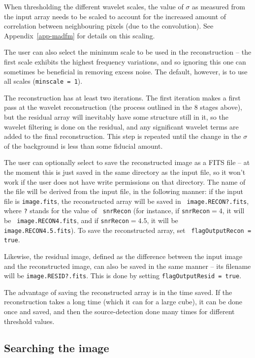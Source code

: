 \documentclass[12pt,a4paper]{article}
\begin{document}
When thresholding the different wavelet scales, the value of $\sigma$
as measured from the input array needs to be scaled to account for the
increased amount of correlation between neighbouring pixels (due to
the convolution). See Appendix~\ref{app-madfm} for details on this
scaling. 

The user can also select the minimum scale to be used in the
reconstruction -- the first scale exhibits the highest frequency
variations, and so ignoring this one can sometimes be beneficial in
removing excess noise. The default, however, is to use all scales
({\tt minscale = 1}).

The reconstruction has at least two iterations. The first iteration
makes a first pass at the wavelet reconstruction (the process outlined
in the 8 stages above), but the residual array will inevitably have
some structure still in it, so the wavelet filtering is done on the
residual, and any significant wavelet terms are added to the final
reconstruction. This step is repeated until the change in the $\sigma$
of the background is less than some fiducial amount.

The user can optionally select to save the reconstructed image as a
FITS file -- at the moment this is just saved in the same directory as
the input file, so it won't work if the user does not have write
permissions on that directory. The name of the file will be derived
from the input file, in the following manner: if the input file is
{\tt image.fits}, the reconstructed array will be saved in {\tt
image.RECON?.fits}, where {\tt ?} stands for the value of {\tt
snrRecon} (for instance, if {\tt snrRecon}$=4$, it will be {\tt
image.RECON4.fits}, and if {\tt snrRecon}$=4.5$, it will be {\tt
image.RECON4.5.fits}). To save the reconstructed array, set {\tt
  flagOutputRecon = true}.

Likewise, the residual image, defined as the difference between the
input image and the reconstructed image, can also be saved in the same
manner -- its filename will be {\tt image.RESID?.fits}. This is done
by setting {\tt flagOutputResid = true}.

The advantage of saving the reconstructed array is in the time saved.
If the reconstruction takes a long time (which it can for a large
cube), it can be done once and saved, and then the source-detection
done many times for different threshold values.

\subsection{Searching the image}
\label{sec-detection}
\end{document}
